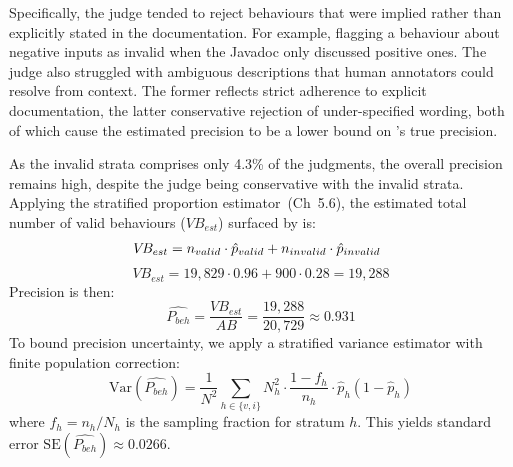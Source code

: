 Specifically, the judge tended to reject behaviours that were implied rather than explicitly stated in the documentation.
For example, flagging a behaviour about negative inputs as invalid when the Javadoc only discussed positive ones. 
The judge also struggled with ambiguous descriptions that human annotators could resolve from context. 
The former reflects strict adherence to explicit documentation, the latter conservative rejection of under-specified wording, both of which cause the estimated precision to be a lower bound on \toolname{}'s true precision. 


As the invalid strata comprises only 4.3\% of the judgments, the overall precision remains high, despite the judge being conservative with the invalid strata.
Applying the stratified proportion estimator~\cite{scheaffer2012elementary}(Ch~5.6),
the estimated total number of valid behaviours ($V\!B_{est}$) surfaced by \toolname{} %
is:
\[
V\!B_{est} = n_{valid} \cdot \hat{p}_{valid} + n_{invalid} \cdot \hat{p}_{invalid} \hspace{0.6em}%
\]
\vspace{-1.5em}
\[
V\!B_{est} = 19{,}829 \cdot 0.96 + 900 \cdot 0.28 = 19{,}288
\]
Precision is then: 
\[
\hat{P_{beh}} = \frac{VB_{est}}{AB} = \frac{19,\!288}{20,\!729} \approx 0.931
\]
To bound precision uncertainty, we apply a stratified variance estimator with finite population correction:
\[
\text{Var}(\hat{P_{beh}}) = \frac{1}{N^2} \sum_{h \in \{v,i\}} 
N_h^2 \cdot \frac{1 - f_h}{n_h} \cdot \hat{p}_h(1-\hat{p}_h)
\] where $f_h = n_h / N_h$ is the sampling fraction for stratum $h$. 
This yields standard error $\text{SE}(\hat{P_{beh}}) \approx 0.0266$.



